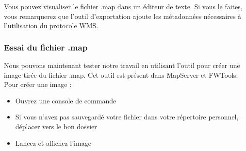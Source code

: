 
Vous pouvez visualiser le fichier .map dans un \'editeur de texte. Si vous le faites, vous remarquerez que l'outil d'exportation ajoute les m\'etadonn\'ees n\'ecessaires \`a l'utilisation du protocole WMS.

%

\subsubsection{Essai du fichier .map}

Nous pouvons maintenant tester notre travail en utilisant l'outil  pour cr\'eer une image tir\'ee du fichier .map. Cet outil est pr\'esent dans MapServer et FWTools. 
Pour cr\'eer une image :

% 

\begin{itemize}
\item Ouvrez une console de commande
\item Si vous n'avez pas sauvegard\'e votre fichier dans votre r\'epertoire personnel, d\'eplacer vers le bon dossier
\item Lancez  et affichez l'image
\end{itemize}
 
